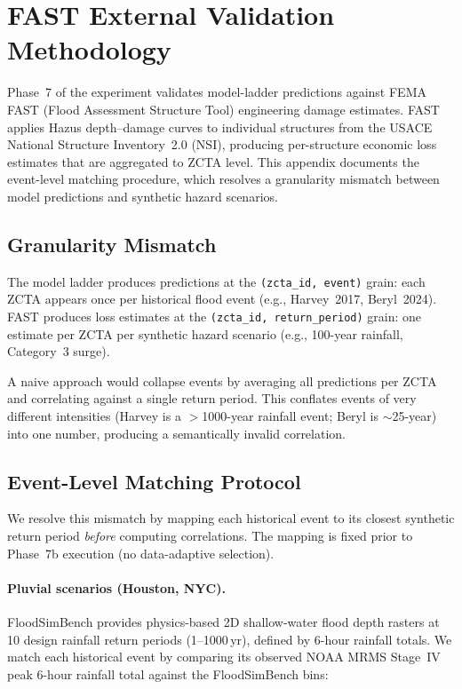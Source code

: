 
\clearpage
\section{FAST External Validation Methodology}
\label{app:fast-validation}

Phase~7 of the experiment validates model-ladder predictions against
FEMA FAST (Flood Assessment Structure Tool) engineering damage estimates.
FAST applies Hazus depth--damage curves to individual structures from the
USACE National Structure Inventory~2.0 (NSI), producing per-structure
economic loss estimates that are aggregated to ZCTA level.  This appendix
documents the event-level matching procedure, which resolves a
granularity mismatch between model predictions and synthetic hazard
scenarios.

\subsection{Granularity Mismatch}
\label{app:fast-mismatch}

The model ladder produces predictions at the \texttt{(zcta\_id, event)}
grain: each ZCTA appears once per historical flood event (e.g., Harvey~2017,
Beryl~2024).  FAST produces loss estimates at the \texttt{(zcta\_id,
return\_period)} grain: one estimate per ZCTA per synthetic hazard
scenario (e.g., 100-year rainfall, Category~3 surge).

A naive approach would collapse events by averaging all predictions per
ZCTA and correlating against a single return period.  This conflates
events of very different intensities (Harvey is a $>$1000-year rainfall
event; Beryl is $\sim$25-year) into one number, producing a semantically
invalid correlation.

\subsection{Event-Level Matching Protocol}
\label{app:fast-matching}

We resolve this mismatch by mapping each historical event to its closest
synthetic return period \emph{before} computing correlations.  The
mapping is fixed prior to Phase~7b execution (no data-adaptive
selection).

\paragraph{Pluvial scenarios (Houston, NYC).}
FloodSimBench provides physics-based 2D shallow-water flood depth
rasters at 10 design rainfall return periods (1--1000\,yr), defined by
6-hour rainfall totals.  We match each historical event by comparing
its observed NOAA MRMS Stage~IV peak 6-hour rainfall total against the
FloodSimBench bins:

